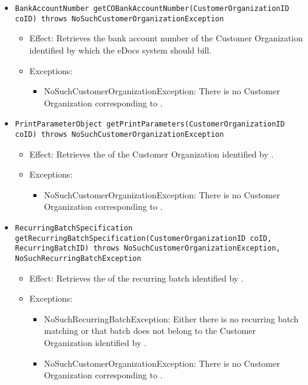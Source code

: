 \begin{itemize}
\begin{itemize}
		\item \texttt{BankAccountNumber getCOBankAccountNumber(CustomerOrganizationID coID) throws NoSuchCustomerOrganizationException}
		    \begin{itemize}
                \item Effect: Retrieves the bank account number of the Customer Organization identified by  which the eDocs system should bill.
                \item Exceptions:
				\begin{itemize}
					\item NoSuchCustomerOrganizationException: There is no Customer Organization corresponding to .
				\end{itemize}
            \end{itemize}

		\item \texttt{PrintParameterObject getPrintParameters(CustomerOrganizationID coID) throws NoSuchCustomerOrganizationException}
		    \begin{itemize}
                \item Effect: Retrieves the  of the Customer Organization identified by .
                \item Exceptions:
				\begin{itemize}
					\item NoSuchCustomerOrganizationException: There is no Customer Organization corresponding to .
				\end{itemize}
            \end{itemize}

		\item \texttt{RecurringBatchSpecification getRecurringBatchSpecification(CustomerOrganizationID coID, RecurringBatchID) throws NoSuchCustomerOrganizationException, NoSuchRecurringBatchException}
		    \begin{itemize}
                \item Effect: Retrieves the  of the recurring batch identified by .
                \item Exceptions:
					\begin{itemize}
						\item NoSuchRecurringBatchException: Either there is no recurring batch matching  or that batch does not belong to the Customer Organization identified by .
						\item NoSuchCustomerOrganizationException: There is no Customer Organization corresponding to .
					\end{itemize}
            \end{itemize}


\end{itemize}
\end{itemize}
